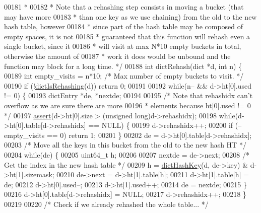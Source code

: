\begin{DoxyCode}
00181 \textcolor{comment}{ *}
00182 \textcolor{comment}{ * Note that a rehashing step consists in moving a bucket (that may have more}
00183 \textcolor{comment}{ * than one key as we use chaining) from the old to the new hash table, however}
00184 \textcolor{comment}{ * since part of the hash table may be composed of empty spaces, it is not}
00185 \textcolor{comment}{ * guaranteed that this function will rehash even a single bucket, since it}
00186 \textcolor{comment}{ * will visit at max N*10 empty buckets in total, otherwise the amount of}
00187 \textcolor{comment}{ * work it does would be unbound and the function may block for a long time. */}
00188 \textcolor{keywordtype}{int} dictRehash(dict *d, \textcolor{keywordtype}{int} n) \{
00189     \textcolor{keywordtype}{int} empty\_visits = n*10; \textcolor{comment}{/* Max number of empty buckets to visit. */}
00190     \textcolor{keywordflow}{if} (!\hyperlink{dict_8h_aa6e4917a6a32fdf47180e03ed8969e02}{dictIsRehashing}(d)) \textcolor{keywordflow}{return} 0;
00191 
00192     \textcolor{keywordflow}{while}(n-- && d->ht[0].used != 0) \{
00193         dictEntry *de, *nextde;
00194 
00195         \textcolor{comment}{/* Note that rehashidx can't overflow as we are sure there are more}
00196 \textcolor{comment}{         * elements because ht[0].used != 0 */}
00197         \hyperlink{redisassert_8h_a993abaa2c168852c1592879472938781}{assert}(d->ht[0].size > (\textcolor{keywordtype}{unsigned} \textcolor{keywordtype}{long})d->rehashidx);
00198         \textcolor{keywordflow}{while}(d->ht[0].table[d->rehashidx] == NULL) \{
00199             d->rehashidx++;
00200             \textcolor{keywordflow}{if} (--empty\_visits == 0) \textcolor{keywordflow}{return} 1;
00201         \}
00202         de = d->ht[0].table[d->rehashidx];
00203         \textcolor{comment}{/* Move all the keys in this bucket from the old to the new hash HT */}
00204         \textcolor{keywordflow}{while}(de) \{
00205             uint64\_t h;
00206 
00207             nextde = de->next;
00208             \textcolor{comment}{/* Get the index in the new hash table */}
00209             h = \hyperlink{dict_8h_a15a270e95a4eea30557df137e9747a95}{dictHashKey}(d, de->key) & d->ht[1].sizemask;
00210             de->next = d->ht[1].table[h];
00211             d->ht[1].table[h] = de;
00212             d->ht[0].used--;
00213             d->ht[1].used++;
00214             de = nextde;
00215         \}
00216         d->ht[0].table[d->rehashidx] = NULL;
00217         d->rehashidx++;
00218     \}
00219 
00220     \textcolor{comment}{/* Check if we already rehashed the whole table... */}

\end{DoxyCode}
